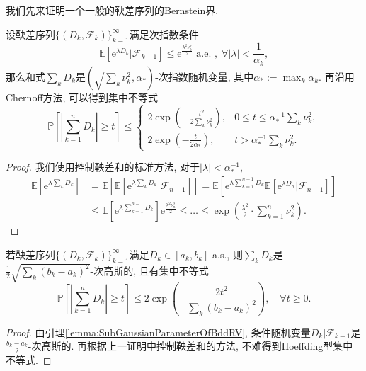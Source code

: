 我们先来证明一个一般的鞅差序列的Bernstein界. 
\begin{lemma}[Azuma]
	设鞅差序列$\{(D_k, \mathcal{F}_k)\}_{k=1}^{\infty}$满足次指数条件
	\begin{equation*}
		\mathbb{E}\left[ \mathrm{e}^{\lambda D_k} | \mathcal{F}_{k-1} \right] 
		\leq \mathrm{e}^{\frac{\lambda^2 \nu_k^2}{2}} \text{ a.e. },\; \forall |\lambda| < \frac{1}{\alpha_k}, 
	\end{equation*}
	那么和式$\sum_k D_k$是$\left( \sqrt{\sum_k \nu_k^2}, \alpha_* \right)$-次指数随机变量, 其中$\alpha_* := \max_k \alpha_k$.  
	再沿用Chernoff方法, 可以得到集中不等式
	\begin{equation*}
		\mathbb{P} \left[ \left| \sum_{k=1}^n D_k \right| \geq t \right] \leq 
		\begin{cases}
			2 \exp\left( -\frac{t^2}{2 \sum_k \nu_k^2} \right), & 0 \leq t \leq \alpha_*^{-1} \sum_k \nu_k^2, \\
			2 \exp\left(- \frac{t}{2 \alpha_*}\right), & t > \alpha_*^{-1} \sum_k \nu_k^2.
		\end{cases}
	\end{equation*}
\end{lemma}
\begin{proof}
	我们使用控制鞅差和的标准方法, 对于$|\lambda| < \alpha_*^{-1}$, 
	\begin{align*}
		\mathbb{E}\left[ \mathrm{e}^{\lambda \sum_k D_k} \right]
		&= \mathbb{E}\left[ \mathbb{E}\left[ \mathrm{e}^{\lambda \sum_k D_k} \bigg| \mathcal{F}_{n-1} \right] \right] 
		= \mathbb{E}\left[ \mathrm{e}^{\lambda \sum_{k=1}^{n-1} D_k} \mathbb{E}[\mathrm{e}^{\lambda D_n} | \mathcal{F}_{n-1}] \right] \\
		&\leq \mathbb{E}\left[ \mathrm{e}^{\lambda \sum_{k=1}^{n-1} D_k} \right]  \mathrm{e}^{\frac{\lambda^2 \nu_n^2}{2}} 
		\leq \dots
		\leq \exp\left(\frac{\lambda^2}{2} \cdot  \sum_{k=1}^n \nu_k^2 \right).
	\end{align*}
\end{proof} 

\begin{theorem}\label{thm:Azuma–Hoeffding}
	若鞅差序列$\{(D_k, \mathcal{F}_k)\}_{k=1}^{\infty}$满足$D_k \in [a_k, b_k]$ a.s., 则$\sum_k D_k$是$\frac{1}{2}\sqrt{\sum_k (b_k - a_k)^2}$-次高斯的, 且有集中不等式
	\begin{equation*}
		\mathbb{P} \left[ \left| \sum_{k=1}^n D_k \right| \geq t \right]
		\leq 2 \exp \left(- \frac{2 t^2}{\sum_k (b_k - a_k)^2} \right), 
		\quad \forall t \geq 0. 
	\end{equation*}	
\end{theorem}
\begin{proof}
	由引理\ref{lemma:SubGaussianParameterOfBddRV}, 条件随机变量$D_k|\mathcal{F}_{k-1}$是$\frac{b_k - a_k}{2}$-次高斯的. 
	再根据上一证明中控制鞅差和的方法, 不难得到Hoeffding型集中不等式. 
\end{proof}

